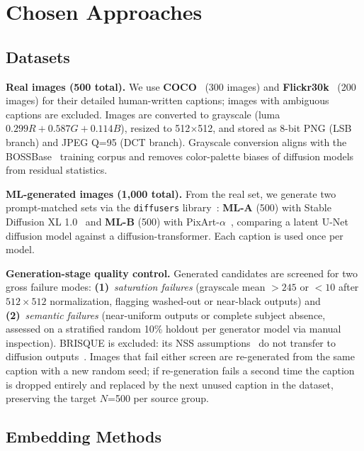 \documentclass[10pt,twocolumn,a4paper]{article}
\begin{document}
\section{Chosen Approaches}
\label{sec:approaches}

\subsection{Datasets}

\textbf{Real images (500 total).} We use \textbf{COCO}~\cite{coco2014} (300 images) and \textbf{Flickr30k}~\cite{flickr30k2014} (200 images) for their detailed human-written captions; images with ambiguous captions are excluded. Images are converted to grayscale (luma $0.299R + 0.587G + 0.114B$), resized to 512$\times$512, and stored as 8-bit PNG (LSB branch) and JPEG Q=95 (DCT branch). Grayscale conversion aligns with the BOSSBase~\cite{bas2011boss} training corpus and removes color-palette biases of diffusion models from residual statistics.

\textbf{ML-generated images (1{,}000 total).} From the real set, we generate two prompt-matched sets via the \texttt{diffusers} library~\cite{diffusers}: \textbf{ML-A} (500) with Stable Diffusion XL 1.0~\cite{sdxl2023} and \textbf{ML-B} (500) with PixArt-$\alpha$~\cite{pixart2023}, comparing a latent U-Net diffusion model against a diffusion-transformer. Each caption is used once per model.

\textbf{Generation-stage quality control.} Generated candidates are screened for two gross failure modes: \textbf{(1)}~\emph{saturation failures} (grayscale mean $>245$ or $<10$ after $512\!\times\!512$ normalization, flagging washed-out or near-black outputs) and \textbf{(2)}~\emph{semantic failures} (near-uniform outputs or complete subject absence, assessed on a stratified random 10\% holdout per generator model via manual inspection). BRISQUE is excluded: its NSS assumptions~\cite{mittal2012brisque} do not transfer to diffusion outputs~\cite{li2024aigiqa}. Images that fail either screen are re-generated from the same caption with a new random seed; if re-generation fails a second time the caption is dropped entirely and replaced by the next unused caption in the dataset, preserving the target $N$=500 per source group.

\subsection{Embedding Methods}
\end{document}
